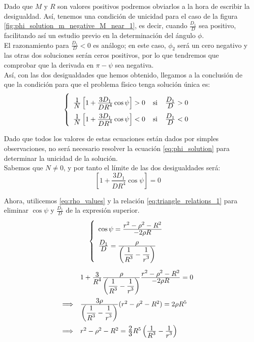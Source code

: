\documentclass[11pt]{article}
\newcommand\ddfrac[2]{\frac{\displaystyle #1}{\displaystyle #2}}
\begin{document}
Dado que $M$ y $R$ son valores positivos podremos obviarlos a la hora de escribir la desigualdad. Así, tenemos una condición de unicidad para el caso de la figura \ref{fig:phi_solution_m_negative_M_near_1}, es decir, cuando $\ddfrac{D_1}{D}$ sea positivo, facilitando así un estudio previo en la determinación del ángulo $\phi$.\\

El razonamiento para $\ddfrac{D_1}{D}<0$ es análogo; en este caso, $\phi_2$ será un cero negativo y las otras dos soluciones serán ceros positivos, por lo que tendremos que comprobar que la derivada en $\pi-\psi$ sea negativa.\\

Así, con las dos desigualdades que hemos obtenido, llegamos a la conclusión de que la condición para que el problema físico tenga solución única es:
\begin{align}
\left\{
\def\arraystretch{2}
\begin{array}{l}
	\ddfrac{1}{N}\left[1+\ddfrac{3D_1}{DR^4}\cos{\psi}\right]>0 \; \; \; \; \text{si} \; \; \; \; \ddfrac{D_1}{D}>0\\
	\ddfrac{1}{N}\left[1+\ddfrac{3D_1}{DR^4}\cos{\psi}\right]<0 \; \; \; \; \text{si} \; \; \; \; \ddfrac{D_1}{D}<0
\end{array}
\right.
\label{eq:condicion_unicidad}
\end{align}

Dado que todos los valores de estas ecuaciones están dados por simples observaciones, no será necesario resolver la ecuación \eqref{eq:phi_solution} para determinar la unicidad de la solución.\\

Sabemos que $N\neq0$, y por tanto el límite de las dos desigualdades será:
\[
\left[1+\ddfrac{3D_1}{DR^4}\cos{\psi}\right]=0
\]

Ahora, utilicemos \eqref{eq:rho_values} y la relación \eqref{eq:triangle_relations_1} para eliminar $\cos{\psi}$ y $\frac{D_1}{D}$ de la expresión superior.
\[
\left\{
\def\arraystretch{2}
\begin{array}{l}
	\cos{\psi}=\ddfrac{r^2-\rho^2-R^2}{-2\rho R}\\
	\ddfrac{D_1}{D}=\ddfrac{\rho}{\left(\ddfrac{1}{R^3}-\ddfrac{1}{r^3}\right)}
\end{array}
\right.
\]
\[
\def\arraystretch{2}
\begin{array}{ll}
& 1+\ddfrac{3}{R^4}\ddfrac{\rho}{\left(\ddfrac{1}{R^3}-\ddfrac{1}{r^3}\right)}\ddfrac{r^2-\rho^2-R^2}{-2\rho R}=0\\
\Longrightarrow & \ddfrac{3\rho}{\left(\ddfrac{1}{R^3}-\ddfrac{1}{r^3}\right)}(r^2-\rho^2-R^2)=2\rho R^5\\
\Longrightarrow & r^2-\rho^2-R^2=\ddfrac{2}{3}R^5\left(\ddfrac{1}{R^3}-\ddfrac{1}{r^3}\right)
\end{array}
\]
\end{document}
